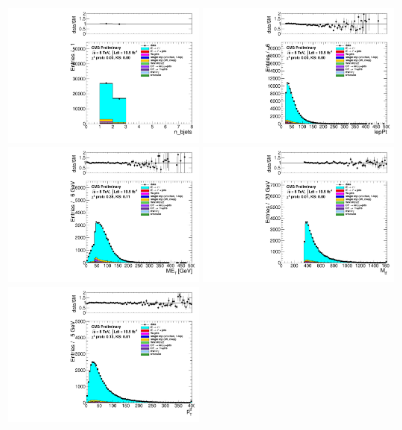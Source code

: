 \begin{figure}[phtb]
  \centering
  \includegraphics[width=0.45\textwidth]{figures/dataMC_nbjets.pdf}
  \includegraphics[width=0.45\textwidth]{figures/dataMC_lepPt.pdf}
  \includegraphics[width=0.45\textwidth]{figures/dataMC_met.pdf}
  \includegraphics[width=0.45\textwidth]{figures/dataMC_ttmass.pdf}
  \includegraphics[width=0.45\textwidth]{figures/dataMC_ttpT.pdf}

\end{figure}
